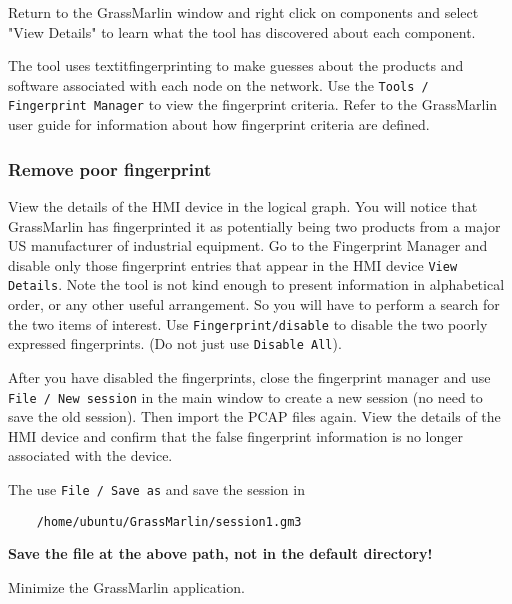 Return to the GrassMarlin window and right click on components and select "View Details" to learn what the tool 
has discovered about each component.

The tool uses textit{fingerprinting} to make guesses about the products and software associated with each node on the
network.  Use the {\tt Tools / Fingerprint Manager} to view the fingerprint criteria.  Refer to the GrassMarlin user guide
for information about how fingerprint criteria are defined.

\subsubsection{Remove poor fingerprint}
View the details of the HMI device in the logical graph.  You will notice that GrassMarlin has fingerprinted it as potentially
being two products from a major US manufacturer of industrial equipment.  Go to the Fingerprint Manager and disable only those 
fingerprint entries that appear in the HMI device {\tt View Details}.  Note the tool is not kind enough to present information in
alphabetical order, or any other useful arrangement.  So you will have to perform a search for the two items of interest.
Use {\tt Fingerprint/disable} to disable the two poorly expressed fingerprints.  (Do not just use {\tt Disable All}).

After you have disabled the fingerprints, close the fingerprint manager and use {\tt File / New session} in the main window
to create a new session (no need to save the old session).  Then import the PCAP files again.  View the details of the HMI device
and confirm that the false fingerprint information is no longer associated with the device.

The use {\tt File / Save as} and save the session in
\begin{verbatim}
    /home/ubuntu/GrassMarlin/session1.gm3
\end{verbatim}
\noindent \textbf{Save the file at the above path, not in the default directory!}


Minimize the GrassMarlin application.

